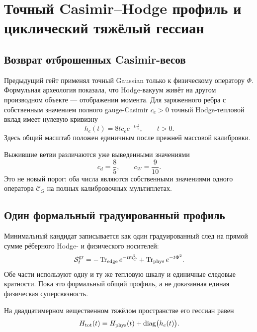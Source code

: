 \chapter{Точный Casimir--Hodge профиль и циклический тяжёлый гессиан}
\label{ch:v7-exact-profile-hodge-cycle-unification-gate}

\section{Возврат отброшенных Casimir-весов}

Предыдущий гейт применял точный Gaussian только к физическому оператору
$\Phi$. Формульная археология показала, что Hodge-вакуум живёт на другом
производном объекте --- отображении момента. Для заряженного ребра с
собственным значением полного gauge-Casimir $c_e>0$ точный Hodge-тепловой
вклад имеет нулевую кривизну
\begin{equation}
 h_e(t)=8tc_e e^{-tc_e^2},\qquad t>0.
 \label{eq:v7-exact-unification-hodge-mass}
\end{equation}
Здесь общий масштаб положен единичным после прежней массовой калибровки.

Выжившие ветви различаются уже выведенными значениями
\begin{equation}
 c_d=\frac85,\qquad c_W=\frac9{10}.
 \label{eq:v7-exact-unification-casimir-values}
\end{equation}
Это не новый порог: оба числа являются собственными значениями одного
оператора $\mathcal C_G$ на полных калибровочных мультиплетах.

\section{Один формальный градуированный профиль}

Минимальный кандидат записывается как один градуированный след на прямой
сумме рёберного Hodge- и физического носителей:
\begin{equation}
 \mathcal S_t^{\rm gr}
 =-\operatorname{Tr}_{\rm edge}e^{-t\mathfrak m_C^2}
  +\operatorname{Tr}_{\rm phys}e^{-t\Phi^2}.
 \label{eq:v7-exact-unification-graded-profile}
\end{equation}
Обе части используют одну и ту же тепловую шкалу и единичные следовые
кратности. Пока это формальный общий профиль, а не доказанная единая
физическая суперсвязность.

На двадцатимерном вещественном тяжёлом пространстве его гессиан равен
\begin{equation}
 H_{\rm tot}(t)=H_{\rm phys}(t)
 +\operatorname{diag}\bigl(h_e(t)\bigr).
 \label{eq:v7-exact-unification-total-hessian}
\end{equation}

